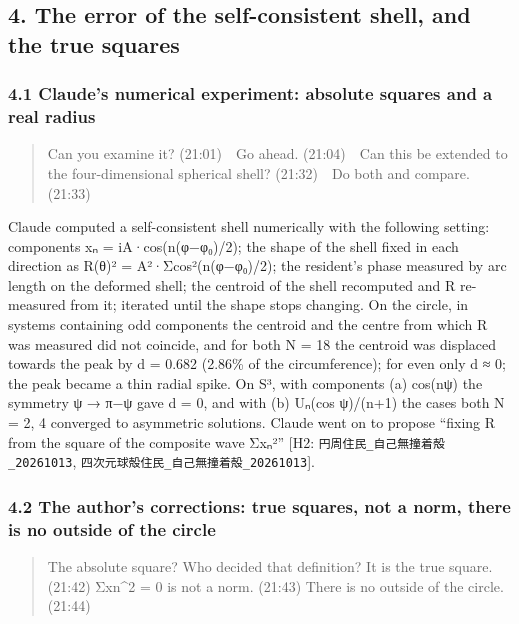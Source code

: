\documentclass[
  a4paper,
]{article}
\begin{document}
\subsection{4. The error of the self-consistent shell, and the true
squares}\label{the-error-of-the-self-consistent-shell-and-the-true-squares}

\subsubsection{4.1 Claude's numerical experiment: absolute squares and a
real
radius}\label{claudes-numerical-experiment-absolute-squares-and-a-real-radius}

\begin{quote}
Can you examine it? (21:01)　Go ahead. (21:04)　Can this be extended to
the four-dimensional spherical shell? (21:32)　Do both and compare.
(21:33)
\end{quote}

Claude computed a self-consistent shell numerically with the following
setting: components xₙ = iA·cos(n(φ−φ₀)/2); the shape of the shell fixed
in each direction as R(θ)² = A²·Σcos²(n(φ−φ₀)/2); the resident's phase
measured by arc length on the deformed shell; the centroid of the shell
recomputed and R re-measured from it; iterated until the shape stops
changing. On the circle, in systems containing odd components the
centroid and the centre from which R was measured did not coincide, and
for both N = 18 the centroid was displaced towards the peak by d = 0.682
(2.86\% of the circumference); for even only d ≈ 0; the peak became a
thin radial spike. On S³, with components (a) cos(nψ) the symmetry ψ →
π−ψ gave d = 0, and with (b) Uₙ(cos ψ)/(n+1) the cases both N = 2, 4
converged to asymmetric solutions. Claude went on to propose ``fixing R
from the square of the composite wave \textbar Σxₙ\textbar²'' {[}H2:
\texttt{円周住民\_\allowbreak{}自己無撞着殻\_\allowbreak{}20261013},
\texttt{四次元球殻住民\_\allowbreak{}自己無撞着殻\_\allowbreak{}20261013}{]}.

\subsubsection{4.2 The author's corrections: true squares, not a norm,
there is no outside of the
circle}\label{the-authors-corrections-true-squares-not-a-norm-there-is-no-outside-of-the-circle}

\begin{quote}
The absolute square? Who decided that definition? It is the true square.
(21:42) Σxn\^{}2 = 0 is not a norm. (21:43) There is no outside of the
circle. (21:44)
\end{quote}
\end{document}
